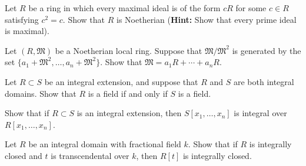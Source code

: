 \documentclass{problemset}
\begin{document}
\begin{exercise}Let \(R\) be a ring in which every maximal ideal is of the form \(cR\) for some \(c \in R\) satisfying \(c^2=c\).  Show that \(R\) is Noetherian (\textbf{Hint:} Show that every prime ideal is maximal).
\end{exercise}


\begin{exercise}Let \((R, \mathfrak{M})\) be a Noetherian local ring.  Suppose that \(\mathfrak{M}/\mathfrak{M}^2\) is generated by the set \(\{a_1+\mathfrak{M}^2,\ldots,a_n+\mathfrak{M}^2\}\).  Show that \(\mathfrak{M}=a_1R+\cdots+a_nR\).
\end{exercise}


\begin{exercise}Let \(R \subset S\) be an integral extension, and suppose that \(R\) and \(S\) are both integral domains.  Show that \(R\) is a field if and only if \(S\) is a field.
\end{exercise}


\begin{exercise}Show that if \(R \subset S\) is an integral extension, then \(S[x_1,\ldots,x_n]\) is integral over \(R[x_1,\ldots,x_n]\).
\end{exercise}


\begin{exercise}Let \(R\) be an integral domain with fractional field \(k\).  Show that if \(R\) is integrally closed and \(t\) is transcendental over \(k\), then \(R[t]\) is integrally closed.
\end{exercise}








\end{document}
